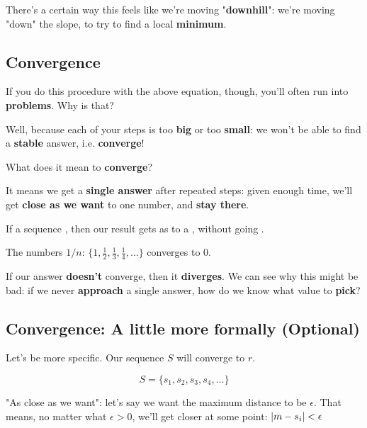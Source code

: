         There's a certain way this feels like we're moving "\textbf{downhill}": we're moving "down" the slope, to try to find a local \textbf{minimum}.
        
    \subsection{Convergence}
    
        If you do this procedure with the above equation, though, you'll often run into \textbf{problems}. Why is that?
        
        Well, because each of your steps is too \textbf{big} or too \textbf{small}: we won't be able to find a \textbf{stable} answer, i.e. \textbf{converge}!
        
        What does it mean to \textbf{converge}? 
        
        It means we get a \textbf{single answer} after repeated steps: given enough time, we'll get \textbf{close as we want} to one number, and \textbf{stay there}.\\
        
        \begin{definition}
            If a sequence , then our result gets as  to a , without going .
        \end{definition}
        
        \miniex The numbers $1/n$: $\{ 1, \frac{1}{2}, \frac{1}{3}, \frac{1}{4}, \dots  \}$ converges to 0.
        
        If our answer \textbf{doesn't} converge, then it \textbf{diverges}. We can see why this might be bad: if we never \textbf{approach} a single answer, how do we know what value to \textbf{pick}?
        
    \subsection{Convergence: A little more formally (Optional)}
        
        Let's be more specific. Our sequence $S$ will converge to $r$.
        
        \begin{equation}
            S = \{ s_1, s_2, s_3, s_4, \dots \} 
        \end{equation}
        
        "As close as we want": let's say we want the maximum distance to be $\epsilon$. That means, no matter what $\epsilon>0$, we'll get closer at some point: $\abs{m-s_i}<\epsilon$
        
